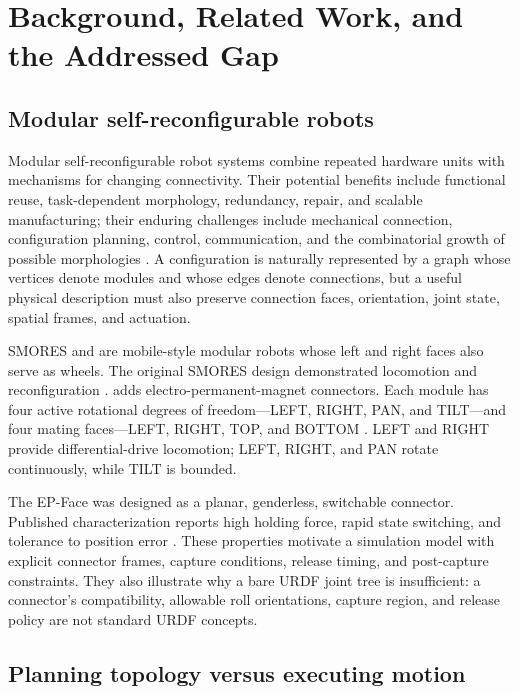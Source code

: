 \section{Background, Related Work, and the Addressed Gap}
\label{sec:background}

\subsection{Modular self-reconfigurable robots}

Modular self-reconfigurable robot systems combine repeated hardware units with
mechanisms for changing connectivity. Their potential benefits include functional
reuse, task-dependent morphology, redundancy, repair, and scalable manufacturing;
their enduring challenges include mechanical connection, configuration planning,
control, communication, and the combinatorial growth of possible morphologies
\citep{yim2007modular}. A configuration is naturally represented by a graph whose
vertices denote modules and whose edges denote connections, but a useful physical
description must also preserve connection faces, orientation, joint state, spatial
frames, and actuation.

SMORES and \smoresep{} are mobile-style modular robots whose left and right faces also
serve as wheels. The original SMORES design demonstrated locomotion and
reconfiguration \citep{davey2012smores}. \smoresep{} adds electro-permanent-magnet
connectors. Each module has four active rotational degrees of freedom---LEFT, RIGHT,
PAN, and TILT---and four mating faces---LEFT, RIGHT, TOP, and BOTTOM
\citep{liu2020parallel,liu2023smoresep,modlabSmoresEp}. LEFT and RIGHT provide
differential-drive locomotion; LEFT, RIGHT, and PAN rotate continuously, while TILT is
bounded.

The EP-Face was designed as a planar, genderless, switchable connector. Published
characterization reports high holding force, rapid state switching, and tolerance to
position error \citep{tosun2016epface}. These properties motivate a simulation model
with explicit connector frames, capture conditions, release timing, and post-capture
constraints. They also illustrate why a bare URDF joint tree is insufficient: a
connector's compatibility, allowable roll orientations, capture region, and release
policy are not standard URDF concepts.

\subsection{Planning topology versus executing motion}

